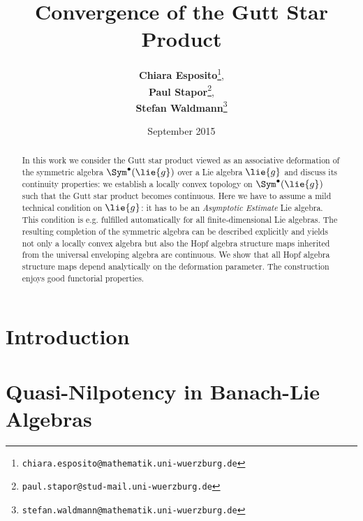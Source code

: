 \documentclass[
11pt,                          %
english                        %
]{article}
\title{Convergence of the Gutt Star Product}
\author{
  \textbf{Chiara Esposito}\thanks{\texttt{chiara.esposito@mathematik.uni-wuerzburg.de}},
  \addtocounter{footnote}{2}
  \textbf{Paul Stapor}\thanks{\texttt{paul.stapor@stud-mail.uni-wuerzburg.de}},
  \addtocounter{footnote}{2}
  \textbf{Stefan Waldmann}\thanks{\texttt{stefan.waldmann@mathematik.uni-wuerzburg.de}}\\[0.5cm]
  \chairXaddress
}
\date{September 2015}
\begin{document}
%
%

\maketitle

%
%

\begin{abstract}
    In this work we consider the Gutt star product viewed as an
    associative deformation of the symmetric algebra
    $\Sym^\bullet(\lie{g})$ over a Lie algebra $\lie{g}$ and discuss
    its continuity properties: we establish a locally convex topology
    on $\Sym^\bullet(\lie{g})$ such that the Gutt star product becomes
    continuous. Here we have to assume a mild technical condition on
    $\lie{g}$: it has to be an \emph{Asymptotic Estimate} Lie
    algebra. This condition is e.g. fulfilled automatically for all
    finite-dimensional Lie algebras.  The resulting completion of the
    symmetric algebra can be described explicitly and yields not only
    a locally convex algebra but also the Hopf algebra structure maps
    inherited from the universal enveloping algebra are continuous.
    We show that all Hopf algebra structure maps depend analytically
    on the deformation parameter. The construction enjoys good
    functorial properties.
\end{abstract}

\newpage


%
%

\tableofcontents
\newpage


%
%

\section{Introduction}
\label{sec:Introduction}


\section{Quasi-Nilpotency in Banach-Lie Algebras}
\label{sec:QuasiNilpotency}
\end{document}
